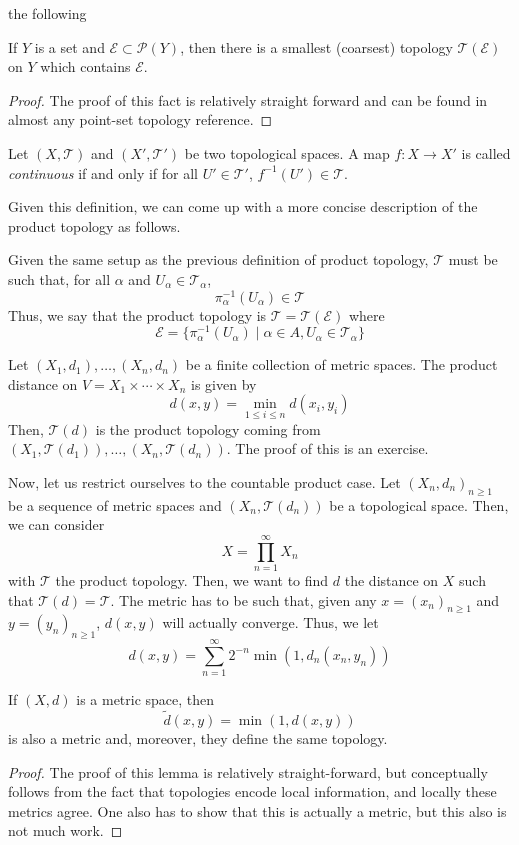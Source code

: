 \documentclass[11pt,leqno,oneside]{amsbook}
\numberwithin{thm}{section}
\renewcommand{\P}{\mathcal{P}} %
\newcommand{\Ep}{\mathcal{E}} %
\newcommand{\Top}{\mathcal{T}} %
\begin{document}
the following
\begin{prop}
  If $Y$ is a set and $\Ep \subset \P(Y)$, then there is a smallest (coarsest)
topology $\Top(\Ep)$ on $Y$ which contains $\Ep$.
\end{prop}
\begin{proof}
  The proof of this fact is relatively straight forward and can be
  found in almost any point-set topology reference.
\end{proof}
\begin{defn}
  Let $(X,\Top)$ and $(X',\Top')$ be two topological spaces. A map $f\colon
  X \to X'$ is called \emph{continuous} if and only if for all $U' \in
  \Top'$, $f^{-1}(U') \in \Top$.
\end{defn}
Given this definition, we can come up with a more concise description
of the product topology as follows.
\begin{defn}
  Given the same setup as the previous definition of product topology,
  $\Top$ must be such that, for all $\alpha$ and $U_\alpha \in
  \Top_\alpha$, \[
    \pi_\alpha^{-1}(U_\alpha) \in \Top
  \]
  Thus, we say that the product topology is $\Top = \Top(\Ep)$
  where \[
    \Ep = \{\pi_{\alpha}^{-1}(U_\alpha) \mid \alpha \in A, U_\alpha
    \in \Top_\alpha\}
  \]
\end{defn}
\begin{rmk}
  Let $(X_1,d_1), \ldots, (X_n,d_n)$ be a finite collection of metric
  spaces. The product distance on $V = X_1 \times \cdots \times X_n$
  is given by \[
    d(x,y) = \min_{1 \leq i \leq n} d(x_i,y_i)
  \]
  Then, $\Top(d)$ is the product topology coming from
  $(X_1,\Top(d_1)), \ldots, (X_n,\Top(d_n))$. The proof of this is an
  exercise.
\end{rmk}
Now, let us restrict ourselves to the countable product case. Let
$(X_n,d_n)_{n \geq 1}$ be a sequence of metric spaces and
$(X_n,\Top(d_n))$ be a topological space. Then, we can consider \[
  X = \prod_{n=1}^\infty X_n
\]
with $\Top$ the product topology. Then, we want to find $d$ the
distance on $X$ such that $\Top(d) = \Top$. The metric has to be such
that, given any $x = (x_n)_{n \geq 1}$ and $y = (y_n)_{n \geq 1}$,
$d(x,y)$ will actually converge. Thus, we let \[
  d(x,y) = \sum_{n=1}^\infty 2^{-n} \min(1,d_n(x_n,y_n))
\]
\begin{lem}
  If $(X,d)$ is a metric space, then \[
    \tilde{d}(x,y) = \min(1,d(x,y))
  \]
  is also a metric and, moreover, they define the same topology.
\end{lem}
\begin{proof}
  The proof of this lemma is relatively straight-forward, but
  conceptually follows from the fact that topologies encode local
  information, and locally these metrics agree. One also has to show
  that this is actually a metric, but this also is not much work.
\end{proof}
\end{document}
